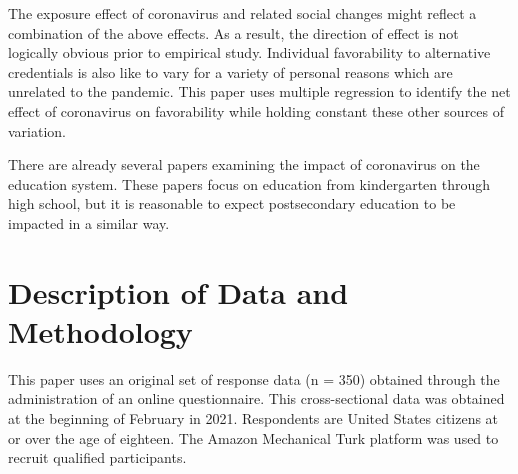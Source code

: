 \documentclass[review]{elsarticle}
\begin{document}
The exposure effect of coronavirus and related social changes might reflect a combination of the above effects.
As a result, the direction of effect is not logically obvious prior to empirical study.
Individual favorability to alternative credentials is also like to vary for a variety of personal reasons which are unrelated to the pandemic.
This paper uses multiple regression to identify the net effect of coronavirus on favorability while holding constant these other sources of variation.

There are already several papers examining the impact of coronavirus on the education system.
These papers focus on education from kindergarten through high school,
but it is reasonable to expect postsecondary education to be impacted in a similar way.


\section{Description of Data and Methodology}

This paper uses an original set of response data (n = 350) obtained through the administration of an online questionnaire.
This cross-sectional data was obtained at the beginning of February in 2021.
Respondents are United States citizens at or over the age of eighteen.
The Amazon Mechanical Turk platform was used to recruit qualified participants.
\end{document}
